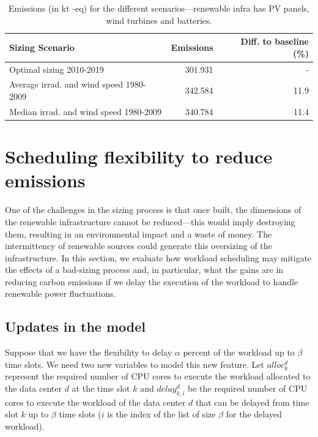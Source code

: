        
\begin{table}[H]
  \caption{Emissions (in kt -eq) for the different scenarios---renewable infra has PV panels, wind turbines and batteries.} \centering
    \label{tab:co2_10y}
      \begin{tabular}{|l|r|r|}        
        \hline        
        \textbf{Sizing Scenario} &  \textbf{Emissions } & \textbf{Diff. to baseline (\%) } \\
        \hline        
        Optimal sizing 2010-2019  &       301.931 & - \\
        \hline     
        Average irrad. and wind speed  1980-2009  &      342.584 &  11.9 \\
        \hline
        Median irrad. and wind speed  1980-2009  &      340.784 &   11.4 \\
        \hline        
      \end{tabular}      
    \end{table}


    
\section{Scheduling flexibility to reduce  emissions}

One of the challenges in the sizing process is that once built, the dimensions of the renewable infrastructure cannot be reduced---this would imply destroying them, resulting in an environmental impact and a waste of money. The intermittency of renewable sources could generate this oversizing of the infrastructure. In this section, we evaluate how workload scheduling may mitigate the effects of a bad-sizing process and, in particular, what the gains are in reducing carbon emissions if we delay the execution of the workload to handle renewable power fluctuations.

\label{sec:flexibility}

\subsection{Updates in the model}

Suppose that we have the flexibility to delay $\alpha$ percent of the workload up to $\beta$ time slots. We need two new variables to model this new feature. Let $alloc^d_k$ represent the required number of CPU cores  to execute the workload allocated to the data center $d$ at the time slot $k$ and $delay_{k,i}^d$ be the required number of CPU cores to execute the workload of the data center $d$ that can be delayed from time slot $k$ up to $\beta$ time slots ($i$ is the index of the list of size $\beta$ for the delayed workload). 

